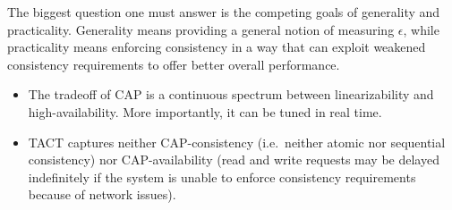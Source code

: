 \documentclass[]             %
{NASA}                       %
\theoremstyle{definition}
\begin{document}
The biggest question one must answer is the competing goals of
generality and practicality. Generality means providing a general notion
of measuring \(\epsilon\), while practicality means enforcing
consistency in a way that can exploit weakened consistency requirements
to offer better overall performance.

\begin{itemize}
\item
  The tradeoff of CAP is a continuous spectrum between linearizability
  and high-availability. More importantly, it can be tuned in real time.
\item
  TACT captures neither CAP-consistency (i.e.~neither atomic nor
  sequential consistency) nor CAP-availability (read and write requests
  may be delayed indefinitely if the system is unable to enforce
  consistency requirements because of network issues).
\end{itemize}
\end{document}
